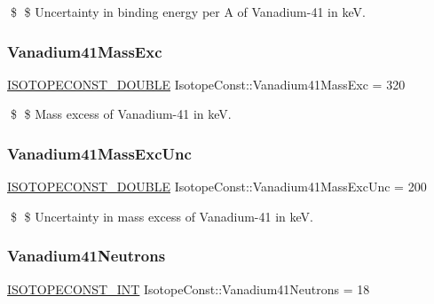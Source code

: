 \$ \$ Uncertainty in binding energy per A of Vanadium-\/41 in keV. \mbox{\label{group___isotope_const-_vanadium-_v41_gab28ff565cff7e496a3e36d2ee2698687}} 
\subsubsection{\texorpdfstring{Vanadium41\+Mass\+Exc}{Vanadium41MassExc}}
{\footnotesize\ttfamily \mbox{\hyperlink{group___isotope_const-_macros_ga8f45a7272ce02c0b4c65c44636ed719a}{I\+S\+O\+T\+O\+P\+E\+C\+O\+N\+S\+T\+\_\+\+D\+O\+U\+B\+LE}} Isotope\+Const\+::\+Vanadium41\+Mass\+Exc = 320}

\$ \$ Mass excess of Vanadium-\/41 in keV. \mbox{\label{group___isotope_const-_vanadium-_v41_ga86098dba5f08bac0261d45c5a79823be}} 
\subsubsection{\texorpdfstring{Vanadium41\+Mass\+Exc\+Unc}{Vanadium41MassExcUnc}}
{\footnotesize\ttfamily \mbox{\hyperlink{group___isotope_const-_macros_ga8f45a7272ce02c0b4c65c44636ed719a}{I\+S\+O\+T\+O\+P\+E\+C\+O\+N\+S\+T\+\_\+\+D\+O\+U\+B\+LE}} Isotope\+Const\+::\+Vanadium41\+Mass\+Exc\+Unc = 200}

\$ \$ Uncertainty in mass excess of Vanadium-\/41 in keV. \mbox{\label{group___isotope_const-_vanadium-_v41_ga19b08f4b0cf7c0ed0823f47a03d3727d}} 
\subsubsection{\texorpdfstring{Vanadium41\+Neutrons}{Vanadium41Neutrons}}
{\footnotesize\ttfamily \mbox{\hyperlink{group___isotope_const-_macros_ga5f18360b3e99483a35c32d789e62621c}{I\+S\+O\+T\+O\+P\+E\+C\+O\+N\+S\+T\+\_\+\+I\+NT}} Isotope\+Const\+::\+Vanadium41\+Neutrons = 18}

